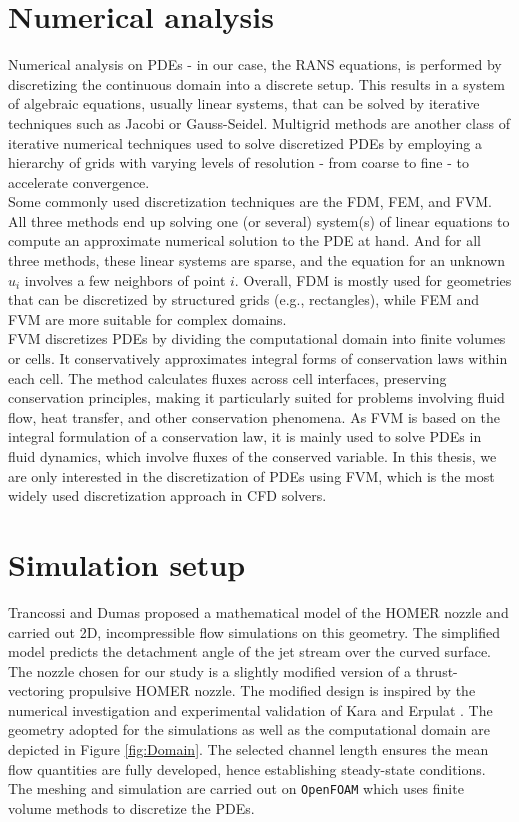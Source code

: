 \section{Numerical analysis}
Numerical analysis on PDEs - in our case, the RANS equations, is performed by discretizing the continuous domain into a discrete setup. This results in a system of algebraic equations, usually linear systems, that can be solved by iterative techniques such as Jacobi or Gauss-Seidel. Multigrid methods are another class of iterative numerical techniques used to solve discretized PDEs by employing a hierarchy of grids with varying levels of resolution - from coarse to fine - to accelerate convergence. \\
Some commonly used discretization techniques are the \gls{FDM}, \gls{FEM}, and \gls{FVM}. All three methods end up solving one (or several) system(s) of linear equations to compute an approximate numerical solution to the PDE at hand. And for all three methods, these linear systems are sparse, and the equation for an unknown $u_i$ involves a few neighbors of point $i$. Overall, FDM is mostly used for geometries that can be discretized by structured grids (e.g., rectangles), while FEM and FVM are more suitable for complex domains. \\
FVM discretizes PDEs by dividing the computational domain into finite volumes or cells. It conservatively approximates integral forms of conservation laws within each cell. The method calculates fluxes across cell interfaces, preserving conservation principles, making it particularly suited for problems involving fluid flow, heat transfer, and other conservation phenomena. As FVM is based on the integral formulation of a conservation law, it is mainly used to solve PDEs in fluid dynamics, which involve fluxes of the conserved variable. In this thesis, we are only interested in the discretization of PDEs using FVM, which is the most widely used discretization approach in CFD solvers. 
\section{Simulation setup} \label{setup}
Trancossi and Dumas \cite{trandum} proposed a mathematical model of the HOMER nozzle and carried out 2D, incompressible flow simulations on this geometry. The simplified model predicts the detachment angle of the jet stream over the curved surface. The nozzle chosen for our study is a slightly modified version of a thrust-vectoring propulsive HOMER nozzle. The modified design is inspired by the numerical investigation and experimental validation of Kara and Erpulat \cite{kara}. The geometry adopted for the simulations as well as the computational domain are depicted in Figure \ref{fig:Domain}. The selected channel length ensures the mean flow quantities are fully developed, hence establishing steady-state conditions. The meshing and simulation are carried out on \verb|OpenFOAM| which uses finite volume methods to discretize the PDEs. 
